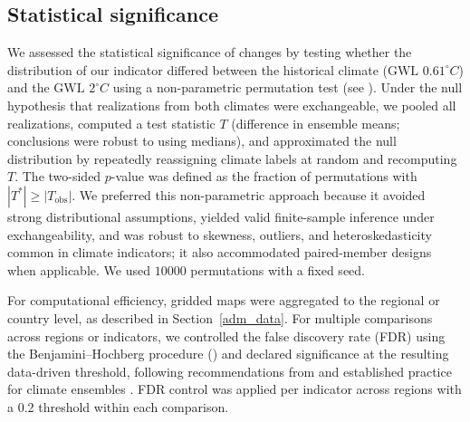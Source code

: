 \documentclass[pdflatex,sn-mathphys-num]{sn-jnl}%
\begin{document}
\subsection{Statistical significance} \label{meth:signif}

We assessed the statistical significance of changes by testing whether the distribution of our indicator differed between the historical climate ($\text{GWL } 0.61^\circ C$) and the $\text{GWL }2^\circ C$ using a non-parametric permutation test (see \cite{Fisher1935, Welch1990, Edgington2007}). Under the null hypothesis that realizations from both climates were exchangeable, we pooled all realizations, computed a test statistic \(T\) (difference in ensemble means; conclusions were robust to using medians), and approximated the null distribution by repeatedly reassigning climate labels at random and recomputing \(T\). The two-sided \(p\)-value was defined as the fraction of permutations with \(|T^\ast| \ge |T_{\text{obs}}|\). We preferred this non-parametric approach because it avoided strong distributional assumptions, yielded valid finite-sample inference under exchangeability, and was robust to skewness, outliers, and heteroskedasticity common in climate indicators; it also accommodated paired-member designs when applicable. We used $10000$ permutations with a fixed seed.

For computational efficiency, gridded maps were aggregated to the regional or country level, as described in Section~\ref{adm_data}. For multiple comparisons across regions or indicators, we controlled the false discovery rate (FDR) using the Benjamini--Hochberg procedure (\cite{Benjamini1995}) and declared significance at the resulting data-driven threshold, following recommendations from \cite{Wilks2016} and established practice for climate ensembles \cite{Zeman2022}. FDR control was applied per indicator across regions with a 0.2 threshold within each comparison.
\end{document}
